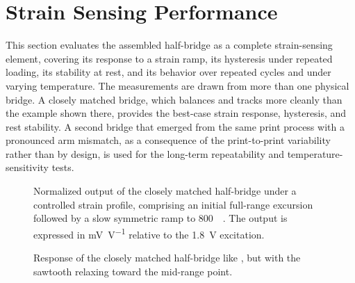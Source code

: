 \section{Strain Sensing Performance}\label{sec:strain_sensing_performance}
This section evaluates the assembled half-bridge as a complete strain-sensing element, covering its response to a strain ramp, its hysteresis under repeated loading, its stability at rest, and its behavior over repeated cycles and under varying temperature. 
The measurements are drawn from more than one physical bridge. A closely matched bridge, which balances and tracks more cleanly than the example shown there, provides the best-case strain response, hysteresis, and rest stability. A second bridge that emerged from the same print process with a pronounced arm mismatch, as a consequence of the print-to-print variability rather than by design, is used for the long-term repeatability and temperature-sensitivity tests.

\begin{figure}[!b]
\centering

    \caption{Normalized output of the closely matched half-bridge under a controlled strain profile, comprising an initial full-range excursion followed by a slow symmetric ramp to \SI{800}{\micro\strain}. The output is expressed in \si{\milli\volt\per\volt} relative to the \SI{1.8}{\volt} excitation.}
    \label{fig:Wheatstone2}
\end{figure}

\begin{figure}[p]
\centering
\vspace*{\fill}

    \caption{Response of the closely matched half-bridge to a decreasing-amplitude sawtooth strain relaxing toward the unloaded start point. Top: normalized output and commanded strain against time. Bottom: the corresponding loop of output against strain, colored by elapsed time.}
    \label{fig:Sawtooth_baseline}
\vspace*{\fill}

    \caption{Response of the closely matched half-bridge like , but with the sawtooth relaxing toward the mid-range point.}
    \label{fig:Sawtooth_center}
\vspace*{\fill}
\end{figure}

